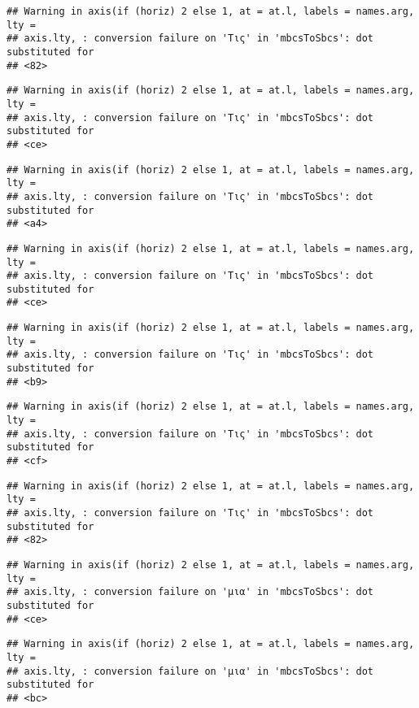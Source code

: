 \documentclass[
]{article}
\begin{document}
\begin{verbatim}
## Warning in axis(if (horiz) 2 else 1, at = at.l, labels = names.arg, lty =
## axis.lty, : conversion failure on 'Τις' in 'mbcsToSbcs': dot substituted for
## <82>
\end{verbatim}

\begin{verbatim}
## Warning in axis(if (horiz) 2 else 1, at = at.l, labels = names.arg, lty =
## axis.lty, : conversion failure on 'Τις' in 'mbcsToSbcs': dot substituted for
## <ce>
\end{verbatim}

\begin{verbatim}
## Warning in axis(if (horiz) 2 else 1, at = at.l, labels = names.arg, lty =
## axis.lty, : conversion failure on 'Τις' in 'mbcsToSbcs': dot substituted for
## <a4>
\end{verbatim}

\begin{verbatim}
## Warning in axis(if (horiz) 2 else 1, at = at.l, labels = names.arg, lty =
## axis.lty, : conversion failure on 'Τις' in 'mbcsToSbcs': dot substituted for
## <ce>
\end{verbatim}

\begin{verbatim}
## Warning in axis(if (horiz) 2 else 1, at = at.l, labels = names.arg, lty =
## axis.lty, : conversion failure on 'Τις' in 'mbcsToSbcs': dot substituted for
## <b9>
\end{verbatim}

\begin{verbatim}
## Warning in axis(if (horiz) 2 else 1, at = at.l, labels = names.arg, lty =
## axis.lty, : conversion failure on 'Τις' in 'mbcsToSbcs': dot substituted for
## <cf>
\end{verbatim}

\begin{verbatim}
## Warning in axis(if (horiz) 2 else 1, at = at.l, labels = names.arg, lty =
## axis.lty, : conversion failure on 'Τις' in 'mbcsToSbcs': dot substituted for
## <82>
\end{verbatim}

\begin{verbatim}
## Warning in axis(if (horiz) 2 else 1, at = at.l, labels = names.arg, lty =
## axis.lty, : conversion failure on 'μια' in 'mbcsToSbcs': dot substituted for
## <ce>
\end{verbatim}

\begin{verbatim}
## Warning in axis(if (horiz) 2 else 1, at = at.l, labels = names.arg, lty =
## axis.lty, : conversion failure on 'μια' in 'mbcsToSbcs': dot substituted for
## <bc>
\end{verbatim}
\end{document}
